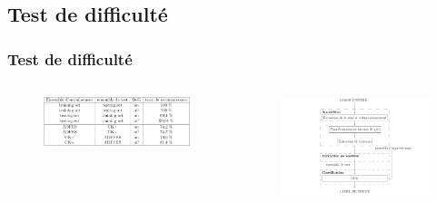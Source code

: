 \documentclass{beamer}
\begin{document}
\subsection{Test de difficulté}
\begin{frame}
  \frametitle{Test de difficulté}
    \begin{columns}
        \begin{figure}
        \includegraphics[scale=0.15]{image/resultat_exp.png}
        \end{figure}

        \begin{figure}
        \includegraphics[scale=0.13]{image/test_exp.png}
        \end{figure}
    \end{columns}
\end{frame}

\end{document}
